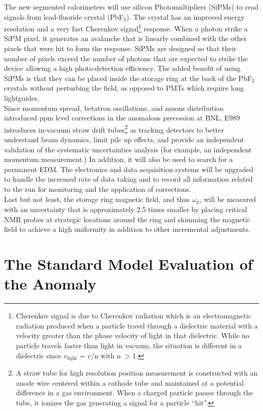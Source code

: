 \documentclass{outhesis}
\begin{document}
The new segmented calorimeters will use silicon Photomultipliers (SiPMs) to read signals from lead-fluoride crystal (PbF$_2$). The crystal has an improved energy resolution and a very fast Cherenkov signal\footnote{Cherenkov signal is due to Cherenkov radiation which is an electromagnetic radiation produced when a particle travel through a dielectric material with a velocity greater than the phase velocity of light in that dielectric. While no particle travels faster than light in vacuum, the situation is different in a dielectric since $v_\text{light}$ = c/n with n $>$1.} response. When a photon strike a SiPM pixel, it generates an avalanche that is linearly combined with the other pixels that were hit to form the response. SiPMs are designed so that their number of pixels exceed the number of photons that are expected to strike the device allowing a high photo-detection efficiency. The added benefit of using SiPMs is that they can be placed inside the storage ring at the back of the PbF$_2$ crystals without perturbing the field, as opposed to PMTs which require long lightguides. \\
Since momentum spread, betatron oscillations, and muons distribution introduced ppm level corrections in the anomalous precession at BNL, E989 introduces in-vacuum straw drift tubes\footnote{A straw tube for high resolution position measurement is constructed with an anode wire centered within a cathode tube and maintained at a potential difference in a gas environment.  When a charged particle passes through the tube, it ionizes the gas generating a signal for a particle ``hit''. } as tracking detectors to better understand beam dynamics, limit pile up effects, and provide an independent validation of the systematic uncertainties analysis (for example, an independent momentum measurement.) In addition, it will also be used to search for a permanent EDM. The electronics and data acquisition systems will be upgraded to handle the increased rate of data taking and to record all information related to the run for monitoring and the application of corrections. \\
Last but not least, the storage ring magnetic field, and thus $\omega_p$, will be measured with an uncertainty that is approximately 2.5 times smaller by placing critical NMR probes at strategic locations around the ring and shimming the magnetic field to achieve a high uniformity in addition to other incremental adjustments. 

\section{The Standard Model Evaluation of the Anomaly}
\label{sm}
\end{document}
